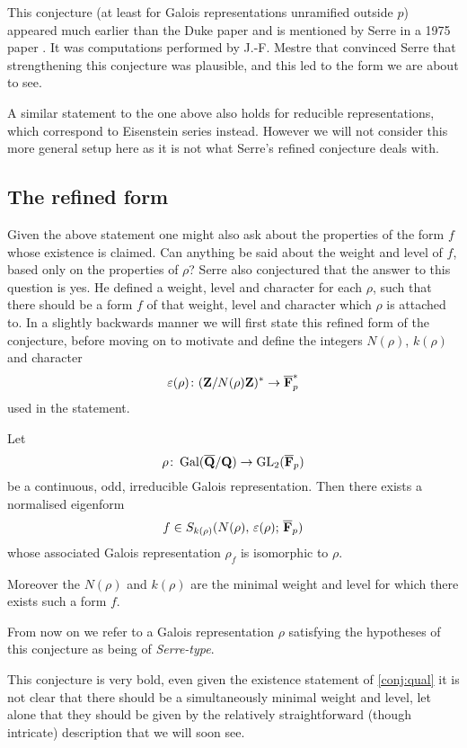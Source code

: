 \documentclass[a4paper,12pt]{article}
\begin{document}
This conjecture (at least for Galois representations unramified outside $p$) appeared much earlier than the Duke paper and is mentioned by Serre in a 1975 paper \cite[sec. 3]{Serre75}.
It was computations performed by J.-F. Mestre that convinced Serre that strengthening this conjecture was plausible, and this led to the form we are about to see.

A similar statement to the one above also holds for reducible representations, which correspond to Eisenstein series instead.
However we will not consider this more general setup here as it is not what Serre's refined conjecture deals with.


\subsection{The refined form}
Given the above statement one might also ask about the properties of the form $f$ whose existence is claimed.
Can anything be said about the weight and level of $f$, based only on the properties of $\rho$?
Serre also conjectured that the answer to this question is yes.
He defined a weight, level and character for each $\rho$, such that there should be a form $f$ of that weight, level and character which $\rho$ is attached to.
In a slightly backwards manner we will first state this refined form of the conjecture, before moving on to motivate and define the integers $N(\rho)$, $k(\rho)$ and character
\[
\varepsilon(\rho)\colon (\mathbf{Z}/N(\rho)\mathbf{Z})^* \to \overline{\mathbf{F}}_p^*
\]
used in the statement.

\begin{conjecture}\label{conj:ref}
Let
\[
\rho\colon \operatorname{Gal}(\overline{\mathbf{Q}}/\mathbf{Q}) \to \operatorname{GL}_2(\overline{\mathbf{F}}_p)
\]
be a continuous, odd, irreducible Galois representation.
Then there exists a normalised eigenform
\[
f\in S_{k(\rho)}(N(\rho),\,\varepsilon(\rho);\,\overline{\mathbf{F}}_p)
\]
whose associated Galois representation $\rho_f$ is isomorphic to $\rho$.

Moreover the $N(\rho)$ and $k(\rho)$ are the minimal weight and level for which there exists such a form $f$.
\end{conjecture}

From now on we refer to a Galois representation $\rho$ satisfying the hypotheses of this conjecture as being of \emph{Serre-type}.

This conjecture is very bold, even given the existence statement of \cref{conj:qual} it is not clear that there should be a simultaneously minimal weight and level, let alone that they should be given by the relatively straightforward (though intricate) description that we will soon see.
\end{document}
